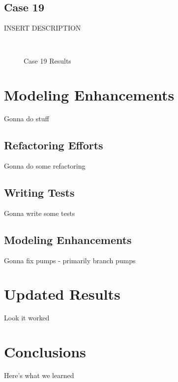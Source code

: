 \documentclass{report}
\begin{document}
        \section{Case 19}\label{sec:current-19}

            INSERT DESCRIPTION

            \begin{figure*}[hbt]
                \centering
                ~
                \caption{Case 19 Results}
            \end{figure*}

    \chapter{Modeling Enhancements}\label{ch:enhancements}

        Gonna do stuff

        \section{Refactoring Efforts}\label{sec:enhancements-refactor}

            Gonna do some refactoring

        \section{Writing Tests}\label{sec:enhancements-tests}

            Gonna write some tests

        \section{Modeling Enhancements}\label{sec:enhancements-fixes}

            Gonna fix pumps - primarily branch pumps

    \chapter{Updated Results}\label{ch:newresults}

        Look it worked

    \chapter{Conclusions}\label{ch:conclusions}

        Here's what we learned
\end{document}
